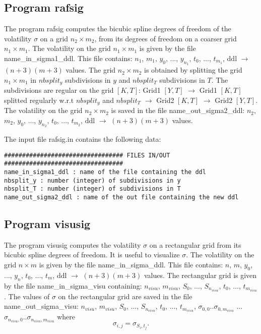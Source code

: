 \documentclass[12pt]{article}
\begin{document}
\subsection{Program rafsig}
\label{SSEC:RAFSIG}

The program rafsig computes the bicubic spline degrees of freedom 
of the volatility $\sigma$ on a grid $n_2 \times m_2$, from its degrees 
of freedom on a coarser grid $n_1 \times m_1$. The volatility on the grid 
$n_1 \times m_1$ is given by the file name\_in\_sigma1\_ddl. This file 
contains: $n_1$, $m_1$, $y_0$, ..., $y_{n_1}$, $t_0$, ..., $t_{m_1}$, 
ddl $\rightarrow$ $(n+3)(m+3)$ values. The grid $n_2 \times m_2$ is 
obtained by splitting the grid $n_1 \times m_1$ in $nbsplit_y$ 
subdivisions in $y$ and $nbsplit_T$ subdivisions in $T$. The subdivisions 
are regular on the grid $[K,T]$: 
Grid1 $[Y,T]$ $\rightarrow$ Grid1 $[K,T]$ splitted regularly w.r.t 
$nbsplit_y$ and $nbsplit_T$ $\rightarrow$ Grid2 $[K,T]$ $\rightarrow$ 
Grid2 $[Y,T]$. The volatility on the grid $n_2 \times m_2$ is saved in the 
file name\_out\_sigma2\_ddl: 
$n_2$, $m_2$, $y_0$, ..., $y_{n_2}$, $t_0$, ..., $t_{m_2}$, 
ddl $\rightarrow$ $(n+3)(m+3)$ values.

The input file rafsig.in contains the following data:
\begin{verbatim}
################################# FILES IN/OUT #################################
name_in_sigma1_ddl : name of the file containing the ddl
nbsplit_y : number (integer) of subdivisions in y
nbsplit_T : number (integer) of subdivisions in T
name_out_sigma2_ddl : name of the out file containing the new ddl
\end{verbatim}

\subsection{Program visusig}
\label{SSEC:VISUSIG}

The program visusig computes the volatility $\sigma$ on a rectangular 
grid from its bicubic spline degrees of freedom. It is useful to 
visualize $\sigma$. The volatility on the grid $n \times m$ is given by 
the file name\_in\_sigma\_ddl. This file contains: 
$n$, $m$, $y_0$, ..., $y_n$, $t_0$, ..., $t_m$, 
ddl $\rightarrow$ $(n+3)(m+3)$ values. The rectangular grid is given by 
the file name\_in\_sigma\_visu containing: 
$n_{visu}$, $m_{visu}$, $S_0$, ..., $S_{n_{visu}}$, $t_0$, ..., 
$t_{m_{visu}}$. The values of $\sigma$ on the rectangular grid are saved 
in the file name\_out\_sigma\_visu: 
$n_{visu}$, $m_{visu}$, $S_0$, ..., $S_{n_{visu}}$, $t_0$, ..., 
$t_{m_{visu}}$, $\sigma_{0,0}$..$\sigma_{0,m_{visu}}$ ... 
$\sigma_{n_{visu},0}$..$\sigma_{n_{visu},m_{visu}}$ where 
$$
\sigma_{i,j} = \sigma_{S_i,t_j}.
$$
\end{document}
